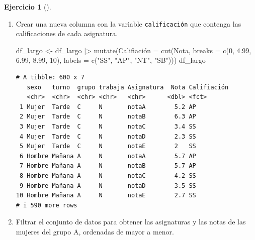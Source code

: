 \documentclass[
  a4paper,
]{scrreport}
\newenvironment{Shaded}{\begin{snugshade}}{\end{snugshade}}
\newcommand{\AttributeTok}[1]{\textcolor[rgb]{0.40,0.45,0.13}{#1}}
\newcommand{\DecValTok}[1]{\textcolor[rgb]{0.68,0.00,0.00}{#1}}
\newcommand{\FloatTok}[1]{\textcolor[rgb]{0.68,0.00,0.00}{#1}}
\newcommand{\FunctionTok}[1]{\textcolor[rgb]{0.28,0.35,0.67}{#1}}
\newcommand{\NormalTok}[1]{\textcolor[rgb]{0.00,0.23,0.31}{#1}}
\newcommand{\OtherTok}[1]{\textcolor[rgb]{0.00,0.23,0.31}{#1}}
\newcommand{\SpecialCharTok}[1]{\textcolor[rgb]{0.37,0.37,0.37}{#1}}
\newcommand{\StringTok}[1]{\textcolor[rgb]{0.13,0.47,0.30}{#1}}
\theoremstyle{definition}
\newtheorem{exercise}{Ejercicio}[chapter]
\theoremstyle{remark}
\begin{document}
\begin{exercise}[]
\begin{enumerate}
\begin{tcolorbox}
  \end{tcolorbox}
\item
  Crear una nueva columna con la variable \texttt{calificación} que
  contenga las calificaciones de cada asignatura.

  \begin{tcolorbox}[enhanced jigsaw, breakable, toptitle=1mm, colbacktitle=quarto-callout-tip-color!10!white, rightrule=.15mm, opacityback=0, opacitybacktitle=0.6, titlerule=0mm, coltitle=black, colframe=quarto-callout-tip-color-frame, colback=white, bottomtitle=1mm, leftrule=.75mm, toprule=.15mm, title=\textcolor{quarto-callout-tip-color}{\faLightbulb}\hspace{0.5em}{Solución}, arc=.35mm, bottomrule=.15mm, left=2mm]

\begin{Shaded}
\begin{Highlighting}[]
\NormalTok{df\_largo }\OtherTok{\textless{}{-}}\NormalTok{ df\_largo }\SpecialCharTok{|\textgreater{}}
    \FunctionTok{mutate}\NormalTok{(Califiación }\OtherTok{=} \FunctionTok{cut}\NormalTok{(Nota, }\AttributeTok{breaks =} \FunctionTok{c}\NormalTok{(}\DecValTok{0}\NormalTok{, }\FloatTok{4.99}\NormalTok{, }\FloatTok{6.99}\NormalTok{, }\FloatTok{8.99}\NormalTok{, }\DecValTok{10}\NormalTok{), }\AttributeTok{labels =} \FunctionTok{c}\NormalTok{(}\StringTok{"SS"}\NormalTok{, }\StringTok{"AP"}\NormalTok{, }\StringTok{"NT"}\NormalTok{, }\StringTok{"SB"}\NormalTok{)))}
\NormalTok{df\_largo}
\end{Highlighting}
\end{Shaded}

\begin{verbatim}
# A tibble: 600 x 7
   sexo   turno  grupo trabaja Asignatura  Nota Califiación
   <chr>  <chr>  <chr> <chr>   <chr>      <dbl> <fct>      
 1 Mujer  Tarde  C     N       notaA        5.2 AP         
 2 Mujer  Tarde  C     N       notaB        6.3 AP         
 3 Mujer  Tarde  C     N       notaC        3.4 SS         
 4 Mujer  Tarde  C     N       notaD        2.3 SS         
 5 Mujer  Tarde  C     N       notaE        2   SS         
 6 Hombre Mañana A     N       notaA        5.7 AP         
 7 Hombre Mañana A     N       notaB        5.7 AP         
 8 Hombre Mañana A     N       notaC        4.2 SS         
 9 Hombre Mañana A     N       notaD        3.5 SS         
10 Hombre Mañana A     N       notaE        2.7 SS         
# i 590 more rows
\end{verbatim}

  \end{tcolorbox}
\item
  Filtrar el conjunto de datos para obtener las asignaturas y las notas
  de las mujeres del grupo A, ordenadas de mayor a menor.


\end{enumerate}
\end{exercise}
\end{document}
